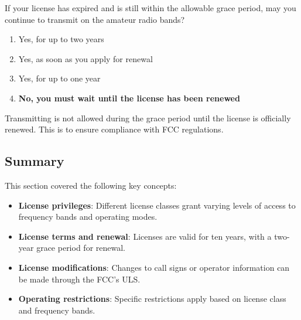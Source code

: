 
\begin{tcolorbox}[colback=gray!10!white,colframe=black!75!black,title={T1C11}]
    If your license has expired and is still within the allowable grace period, may you continue to transmit on the amateur radio bands?
    \begin{enumerate}[label=\Alph*),noitemsep]
        \item Yes, for up to two years
        \item Yes, as soon as you apply for renewal
        \item Yes, for up to one year
        \item \textbf{No, you must wait until the license has been renewed}
    \end{enumerate}
\end{tcolorbox}
Transmitting is not allowed during the grace period until the license is officially renewed. This is to ensure compliance with FCC regulations.


\subsection*{Summary}
This section covered the following key concepts:
\begin{itemize}
    \item \textbf{License privileges}: Different license classes grant varying levels of access to frequency bands and operating modes.
    \item \textbf{License terms and renewal}: Licenses are valid for ten years, with a two-year grace period for renewal.
    \item \textbf{License modifications}: Changes to call signs or operator information can be made through the FCC's ULS.
    \item \textbf{Operating restrictions}: Specific restrictions apply based on license class and frequency bands.
\end{itemize}
